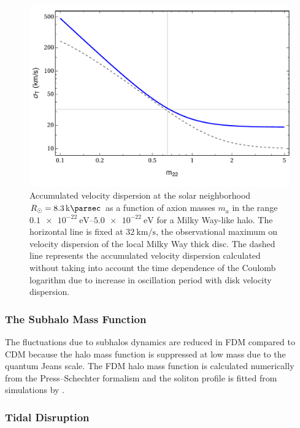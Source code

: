 \documentclass[usenatbib]{mnras}
\begin{document}
\begin{figure}
\includegraphics[width=\columnwidth]{FDM_mass_dep}
\vspace*{-5mm}
\caption{Accumulated velocity dispersion at the solar neighborhood $R_{\odot} = \SI{8.3}{\kilo\parsec}$ as a function of axion masses $m_{a}$ in the range $\SIrange{0.1 e-22}{5.0 e-22}{\electronvolt}$ for a Milky Way-like halo. The horizontal line is fixed at $\SI{32}{\kilo\meter\per\second}$, the observational maximum on velocity dispersion of the local Milky Way thick disc. The dashed line represents the accumulated velocity dispersion calculated without taking into account the time dependence of the Coulomb logarithm due to increase in oscillation period with disk velocity dispersion.}
\label{fig:mass_dep_heating}
\end{figure}

\subsubsection{The Subhalo Mass Function}
The fluctuations due to subhalos dynamics are reduced in FDM compared to CDM because the halo mass function is suppressed at low mass due to the quantum Jeans scale. The FDM halo mass function is calculated numerically from the Press--Schechter formalism \citep{substructure_FDM, marsh} and the soliton profile is fitted from simulations by \cite{schive_solitons}. 
\subsubsection{Tidal Disruption}
 
\end{document}
